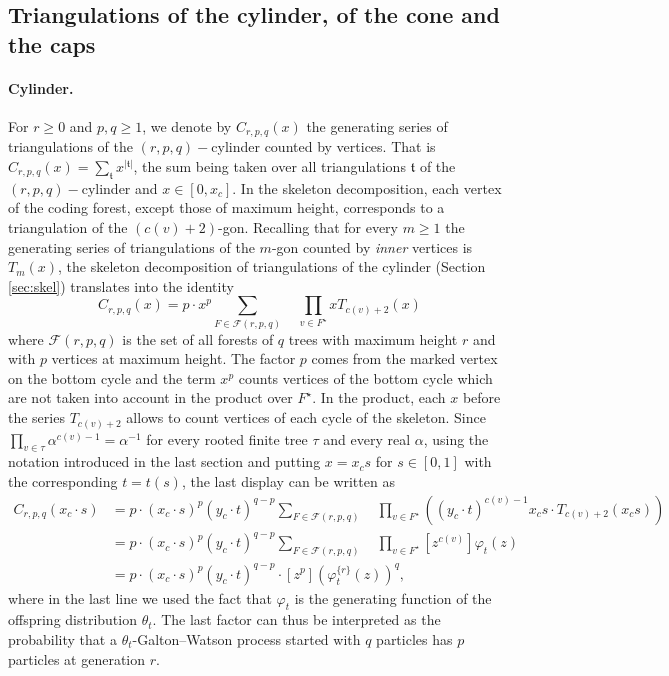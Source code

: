 \documentclass[10pt]{amsart}
\theoremstyle{definition}\newtheorem{defi}[theo]{Definition}\newtheorem{rema}[theo]{Remark}\newtheorem{exam}[theo]{Example}\newtheorem{exem}[theo]{Example}\newtheorem{nota}[theo]{Notation}
\begin{document}
\subsection{Triangulations of the cylinder, of the cone and the caps}

\paragraph{Cylinder.} For $r \geq 0$ and $p, q\geq 1$, we denote by $C_{r,p,q}(x)$ the generating series of triangulations of the $(r,p,q)-$cylinder counted by vertices. That is $C_{r,p,q}(x) = \sum_{\mathfrak t} x^{|\mathfrak t|}$, the sum being taken over all triangulations $\mathfrak t$ of the $(r,p,q)-$cylinder and $x \in [0,x_{c}]$. In the skeleton decomposition, each vertex of the coding forest, except those of maximum height, corresponds to a triangulation of the $(c(v)+2)$-gon. Recalling that for every $m \geq 1$ the generating series of triangulations of the $m$-gon counted by \emph{inner} vertices is $T_m(x)$, the skeleton decomposition of triangulations of the cylinder (Section \ref{sec:skel}) translates into the identity
\[
C_{r,p,q}(x) = p \cdot x^p \sum_{F \in \mathcal{F}(r,p,q)} \quad \prod_{v \in F^\star} x T_{c(v)+2}(x)
\]
where $\mathcal{F}(r,p,q)$ is the set of all forests of $q$ trees with maximum height $r$ and with $p$ vertices at maximum height. The factor $p$ comes from the marked vertex on the bottom cycle and the term $x^p$ counts vertices of the bottom cycle which are not taken into account in the product over $F^\star$. In the product, each $x$ before the series $T_{c(v)+2}$ allows to count vertices of each cycle of the skeleton. Since $\prod_{v \in \tau} \alpha^{c(v) -1} = \alpha^{-1}$ for every rooted finite tree $\tau$ and every real $\alpha$, using the notation introduced in the last section and putting $x = x_{c}s$ for $s \in [0,1]$ with the corresponding $t=t(s)$, the last display can be written as
\begin{align}
C_{r,p,q}(x_c \cdot s) &= p \cdot (x_c \cdot s)^p (y_c \cdot t)^{q-p} \sum_{F \in \mathcal{F}(r,p,q)} \quad \prod_{v \in F^\star}
\left( (y_c \cdot t )^{c(v)-1} x_c s \cdot T_{c(v) + 2}(x_c s) \right)\nonumber \\
&=p \cdot (x_c \cdot s)^p (y_c \cdot t)^{q-p} \sum_{F \in \mathcal{F}(r,p,q)} \quad \prod_{v \in F^\star}
\left[ z^{c(v)}  \right]\varphi_t(z)\nonumber \\
\label{eq:gencylinder}
 &=
p \cdot (x_c \cdot s)^p (y_c \cdot t)^{q-p}
\cdot \left[ z^p  \right] \left(\varphi_t^{\{r\}} (z) \right)^q,
\end{align}
where in the last line we used the fact that $\varphi_{t}$ is the generating function of the offspring distribution $\theta_{t}$. The last factor can thus be  interpreted as the probability that a $\theta_{t}$-Galton--Watson process started with $q$ particles has $p$ particles at generation $r$.
\end{document}
